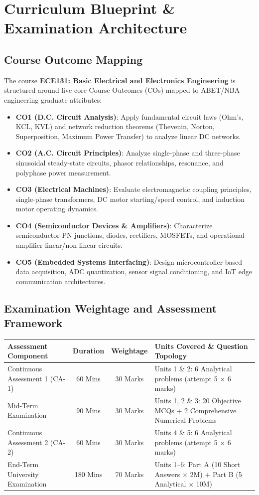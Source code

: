 \chapter*{Curriculum Blueprint \& Examination Architecture}

\section*{Course Outcome Mapping}
The course \textbf{ECE131: Basic Electrical and Electronics Engineering} is structured around five core Course Outcomes (COs) mapped to ABET/NBA engineering graduate attributes:
\begin{itemize}[leftmargin=1.5em]
    \item \textbf{CO1 (D.C. Circuit Analysis)}: Apply fundamental circuit laws (Ohm's, KCL, KVL) and network reduction theorems (Thevenin, Norton, Superposition, Maximum Power Transfer) to analyze linear DC networks.
    \item \textbf{CO2 (A.C. Circuit Principles)}: Analyze single-phase and three-phase sinusoidal steady-state circuits, phasor relationships, resonance, and polyphase power measurement.
    \item \textbf{CO3 (Electrical Machines)}: Evaluate electromagnetic coupling principles, single-phase transformers, DC motor starting/speed control, and induction motor operating dynamics.
    \item \textbf{CO4 (Semiconductor Devices \& Amplifiers)}: Characterize semiconductor PN junctions, diodes, rectifiers, MOSFETs, and operational amplifier linear/non-linear circuits.
    \item \textbf{CO5 (Embedded Systems Interfacing)}: Design microcontroller-based data acquisition, ADC quantization, sensor signal conditioning, and IoT edge communication architectures.
\end{itemize}

\section*{Examination Weightage and Assessment Framework}
\begin{center}\small
\begin{tabularx}{\linewidth}{l c c X}
\toprule
\textbf{Assessment Component} & \textbf{Duration} & \textbf{Weightage} & \textbf{Units Covered \& Question Topology} \\
\midrule
Continuous Assessment 1 (CA-1) & 60 Mins & 30 Marks & Units 1 \& 2: 6 Analytical problems (attempt 5 $\times$ 6 marks) \\
Mid-Term Examination & 90 Mins & 30 Marks & Units 1, 2 \& 3: 20 Objective MCQs + 2 Comprehensive Numerical Problems \\
Continuous Assessment 2 (CA-2) & 60 Mins & 30 Marks & Units 4 \& 5: 6 Analytical problems (attempt 5 $\times$ 6 marks) \\
End-Term University Examination & 180 Mins & 70 Marks & Units 1--6: Part A (10 Short Answers $\times$ 2M) + Part B (5 Analytical $\times$ 10M) \\
\bottomrule
\end{tabularx}
\end{center}
\newpage
